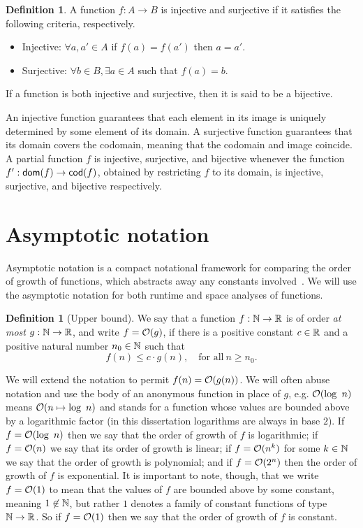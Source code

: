 \documentclass[12pt,phd,lfcs,twoside,openright,logo,leftchapter,normalheadings]{infthesis}
\theoremstyle{plain}
\theoremstyle{definition}
\newtheorem{definition}[theorem]{Definition}
\begin{document}
\begin{definition}
  A function $f : A \to B$ is injective and surjective if it satisfies
  the following criteria, respectively.
  \begin{itemize}
    \item Injective: $\forall a,a' \in A$ if $f(a) = f(a')$ then $a = a'$.
    \item Surjective: $\forall b \in B,\exists a \in A$ such that $f(a) = b$.
  \end{itemize}
  If a function is both injective and surjective, then it is said to
  be a bijective.
\end{definition}
%
An injective function guarantees that each element in its image is
uniquely determined by some element of its domain.
%
A surjective function guarantees that its domain covers the codomain,
meaning that the codomain and image coincide.
%
A partial function $f$ is injective, surjective, and bijective
whenever the function $f' : \mathsf{dom}(f) \to \mathsf{cod}(f)$, obtained by
restricting $f$ to its domain, is injective, surjective, and bijective
respectively.

\section{Asymptotic notation}
\label{sec:asymp-not}

Asymptotic notation is a compact notational framework for comparing
the order of growth of functions, which abstracts away any constants
involved~\cite{Bachmann94}. We will use the asymptotic notation for
both runtime and space analyses of functions.

\begin{definition}[Upper bound]
  We say that a function $f : \mathbb{N} \to \mathbb{R}$ is of order \emph{at most}
  $g : \mathbb{N} \to \mathbb{R}$, and write $f = \mathcal{O}(g)$, if there is a positive
  constant $c \in \mathbb{R}$ and a positive natural number $n_0 \in \mathbb{N}$ such that
  \[
    f(n) \leq c \cdot g(n),\quad \text{for all}~ n \geq n_0.
  \]
\end{definition}
%
We will extend the notation to permit $f(n) = \mathcal{O}(g(n))$.
%
We will often abuse notation and use the body of an anonymous function
in place of $g$, e.g. $\mathcal{O}(\log~n)$ means $\mathcal{O}(n \mapsto \log~n)$
and stands for a function whose values are bounded above by a
logarithmic factor (in this dissertation logarithms are always in base
$2$). If $f = \mathcal{O}(\log~n)$ then we say that the order of growth of
$f$ is logarithmic; if $f = \mathcal{O}(n)$ we say that its order of growth
is linear; if $f = \mathcal{O}(n^k)$ for some $k \in \mathbb{N}$ we say that the
order of growth is polynomial; and if $f = \mathcal{O}(2^n)$ then the order
of growth of $f$ is exponential.
%
It is important to note, though, that we write $f = \mathcal{O}(1)$ to mean
that the values of $f$ are bounded above by some constant, meaning
$1 \not\in \mathbb{N}$, but rather $1$ denotes a family of constant functions
of type $\mathbb{N} \to \mathbb{R}$. So if $f = \mathcal{O}(1)$ then we say that the order
of growth of $f$ is constant.
\end{document}
